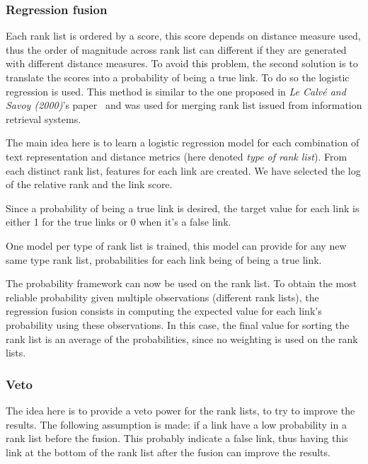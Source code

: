 \subsubsection{Regression fusion \label{sec:regression_fusion}}

Each rank list is ordered by a score, this score depends on distance measure used, thus the order of magnitude across rank list can different if they are generated with different distance measures.
To avoid this problem, the second solution is to translate the scores into a probability of being a true link.
To do so the logistic regression is used.
This method is similar to the one proposed in \textit{Le Calvé and Savoy (2000)}'s paper~\cite{le_calve_database_merging} and was used for merging rank list issued from information retrieval systems.

The main idea here is to learn a logistic regression model for each combination of text representation and distance metrics (here denoted \textit{type of rank list}).
From each distinct rank list, features for each link are created.
We have selected the log of the relative rank and the link score.

Since a probability of being a true link is desired, the target value for each link is either 1 for the true links or 0 when it's a false link.

One model per type of rank list is trained, this model can provide for any new same type rank list, probabilities for each link being of being a true link.

The probability framework can now be used on the rank list.
To obtain the most reliable probability given multiple observations (different rank lists), the regression fusion consists in computing the expected value for each link's probability using these observations.
In this case, the final value for sorting the rank list is an average of the probabilities, since no weighting is used on the rank lists.

\subsubsection{Veto}

The idea here is to provide a veto power for the rank lists, to try to improve the results.
The following assumption is made: if a link have a low probability in a rank list before the fusion.
This probably indicate a false link, thus having this link at the bottom of the rank list after the fusion can improve the results.

